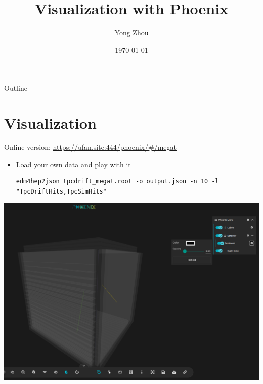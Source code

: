 \documentclass[presentation]{beamer}
\author{Yong Zhou}
\date{\today}
\title{Visualization with Phoenix}
\begin{document}
\maketitle
\begin{frame}{Outline}
\tableofcontents
\end{frame}


\section{Visualization}
\label{sec:org9ea1783}
Online version: \url{https://ufan.site:444/phoenix/\#/megat}

\begin{itemize}
\item Load your own data and play with it
\begin{verbatim}
edm4hep2json tpcdrift_megat.root -o output.json -n 10 -l "TpcDriftHits,TpcSimHits"
\end{verbatim}
\end{itemize}
\begin{center}
\includegraphics[width=.9\linewidth]{megat_online.png}
\end{center}
\end{document}
